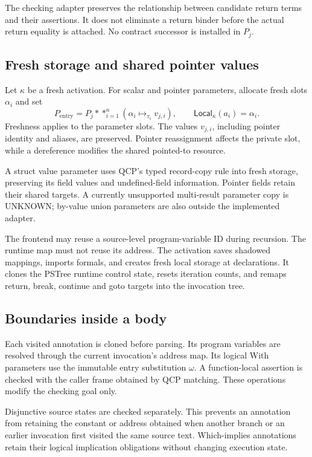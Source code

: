 \documentclass[10pt]{article}
\begin{document}
The checking adapter preserves the relationship between candidate return
terms and their assertions. It does not eliminate a return binder before the
actual return equality is attached. No contract successor is installed in
$P_j$.

\subsection{Fresh storage and shared pointer values}
Let $\kappa$ be a fresh activation. For scalar and pointer parameters, allocate
fresh slots $\alpha_i$ and set
\[
 P_{\mathrm{entry}}=P_j*
       \mathop{\ast}_{i=1}^{n}(\alpha_i\mapsto_{\tau_i}v_{j,i}),
 \qquad \mathsf{Local}_{\kappa}(a_i)=\alpha_i.
\]
Freshness applies to the parameter slots. The values $v_{j,i}$, including
pointer identity and aliases, are preserved. Pointer reassignment affects the
private slot, while a dereference modifies the shared pointed-to resource.

A struct value parameter uses QCP's typed record-copy rule into fresh storage,
preserving its field values and undefined-field information. Pointer fields
retain their shared targets. A currently unsupported multi-result parameter
copy is UNKNOWN; by-value union parameters are also outside the implemented
adapter.

The frontend may reuse a source-level program-variable ID during recursion.
The runtime map must not reuse its address. The activation saves shadowed
mappings, imports formals, and creates fresh local storage at declarations.
It clones the PSTree runtime control state, resets iteration counts, and
remaps return, break, continue and goto targets into the invocation tree.

\subsection{Boundaries inside a body}
Each visited annotation is cloned before parsing. Its program variables are
resolved through the current invocation's address map. Its logical With
parameters use the immutable entry substitution $\omega$. A function-local
assertion is checked with the caller frame obtained by QCP matching.
These operations modify the checking goal only.

Disjunctive source states are checked separately. This prevents an annotation
from retaining the constant or address obtained when another branch or an
earlier invocation first visited the same source text. Which-implies
annotations retain their logical implication obligations without changing
execution state.
\end{document}
